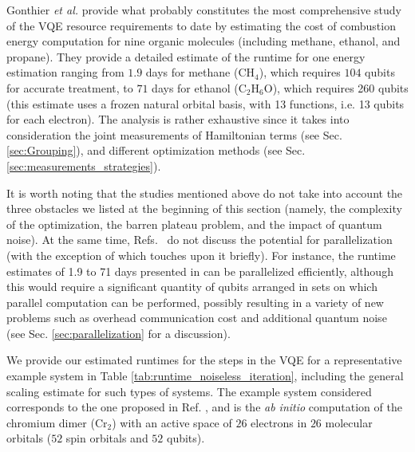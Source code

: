 Gonthier {\it et al.} \cite{Gonthier2020} provide what probably constitutes the most comprehensive study of the VQE resource requirements to date by estimating the cost of combustion energy computation for nine organic molecules (including methane, ethanol, and propane). They provide a detailed estimate of the runtime for one energy estimation ranging from $1.9$ days for methane ($\mathrm{CH_4}$), which requires $104$ qubits for accurate treatment, to $71$ days for ethanol ($\mathrm{C_2H_6O}$), which requires 260 qubits (this estimate uses a frozen natural orbital basis, with 13 functions, i.e. 13 qubits for each electron). The analysis is rather exhaustive since it takes into consideration the joint measurements of Hamiltonian terms (see Sec. \ref{sec:Grouping}), and different optimization methods (see Sec. \ref{sec:measurements_strategies}). 

It is worth noting that the studies mentioned above do not take into account the three obstacles we listed at the beginning of this section (namely, the complexity of the optimization, the barren plateau problem, and the impact of quantum noise). At the same time, Refs.~\cite{Kuhn2019, Gonthier2020, Elfving2020} do not discuss the potential for parallelization (with the exception of \cite{Elfving2020} which touches upon it briefly). For instance, the runtime estimates of 1.9 to 71 days presented in \cite{Gonthier2020} can be parallelized efficiently, although this would require a significant quantity of qubits arranged in sets on which parallel computation can be performed, possibly resulting in a variety of new problems such as overhead communication cost and additional quantum noise (see Sec. \ref{sec:parallelization} for a discussion). 

We provide our estimated runtimes for the steps in the VQE for a representative example system in Table \ref{tab:runtime_noiseless_iteration}, including the general scaling estimate for such types of systems. The example system considered corresponds to the one proposed in Ref. \cite{Elfving2020}, and is the \textit{ab initio} computation of the chromium dimer ($\mathrm{Cr_2}$) with an active space of $26$ electrons in $26$ molecular orbitals ($52$ spin orbitals and $52$ qubits).

